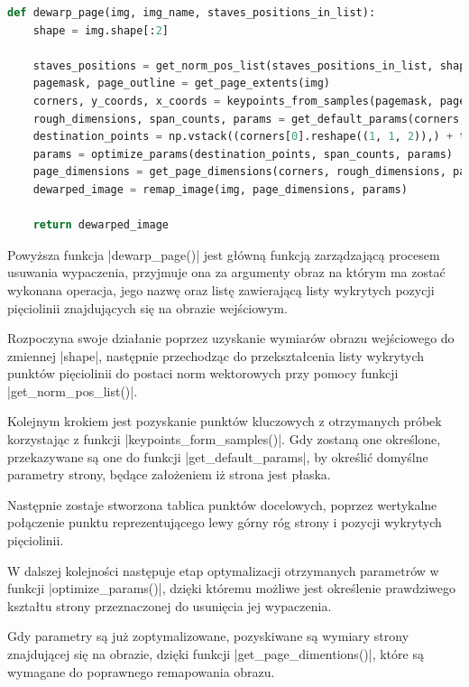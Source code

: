 \begin{lstlisting}[caption={\pyth|dewarp_page()| - główna funkcja usuwania wypaczania obrazu.}, label={dewarp-page}, language=Python]
def dewarp_page(img, img_name, staves_positions_in_list):
	shape = img.shape[:2]
	
	staves_positions = get_norm_pos_list(staves_positions_in_list, shape)
	pagemask, page_outline = get_page_extents(img)
	corners, y_coords, x_coords = keypoints_from_samples(pagemask, page_outline, staves_positions)
	rough_dimensions, span_counts, params = get_default_params(corners, y_coords, x_coords)
	destination_points = np.vstack((corners[0].reshape((1, 1, 2)),) + tuple(staves_positions))
	params = optimize_params(destination_points, span_counts, params)
	page_dimensions = get_page_dimensions(corners, rough_dimensions, params)
	dewarped_image = remap_image(img, page_dimensions, params)
	
	return dewarped_image
\end{lstlisting}

Powyższa funkcja \pyth|dewarp_page()| jest główną funkcją zarządzającą procesem usuwania wypaczenia, przyjmuje ona za argumenty obraz na którym ma zostać wykonana operacja, jego nazwę oraz listę zawierającą listy wykrytych pozycji pięciolinii znajdujących się na obrazie wejściowym.

Rozpoczyna swoje działanie poprzez uzyskanie wymiarów obrazu wejściowego do zmiennej \pyth|shape|, następnie przechodząc do przekształcenia listy wykrytych punktów pięciolinii do postaci norm wektorowych przy pomocy funkcji \pyth|get_norm_pos_list()|.

Kolejnym krokiem jest pozyskanie punktów kluczowych z otrzymanych próbek korzystając z funkcji \pyth|keypoints_form_samples()|. Gdy zostaną one określone, przekazywane są one do funkcji \pyth|get_default_params|, by określić domyślne parametry strony, będące założeniem iż strona jest płaska.

Następnie zostaje stworzona tablica punktów docelowych, poprzez wertykalne połączenie punktu reprezentującego lewy górny róg strony i pozycji wykrytych pięciolinii.

W dalszej kolejności następuje etap optymalizacji otrzymanych parametrów w funkcji \pyth|optimize_params()|, dzięki któremu możliwe jest określenie prawdziwego kształtu strony przeznaczonej do usunięcia jej wypaczenia.

Gdy parametry są już zoptymalizowane, pozyskiwane są wymiary strony znajdującej się na obrazie, dzięki funkcji \pyth|get_page_dimentions()|, które są wymagane do poprawnego remapowania obrazu.

